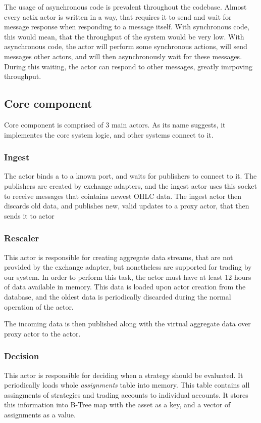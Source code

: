 
The usage of asynchronous code is prevalent throughout the codebase. Almost every actix actor is written in a way, that requires
it to send and wait for message response when responding to a message itself. With synchronous code, this would mean, that
the throughput of the system would be very low. With asynchronous code, the actor will perform some synchronous actions,
will send messages other actors, and will then asynchronously wait for these messages. During this waiting, the actor
can respond to other messages, greatly imrpoving throughput.

\subsection{Core component}
Core component is comprised of 3 main actors. As its name suggests, it implementes the core system logic, and
other systems connect to it.

\subsubsection{Ingest}
The  actor binds a  to a known port, and waits for publishers to connect to it.
The publishers are created by exchange adapters, and the ingest actor uses this socket to receive
messages that cointains newest OHLC data. The ingest actor then discards old data, and publishes new, valid updates
to a proxy actor, that then sends it to  actor

\subsubsection{Rescaler}
This actor is responsible for creating aggregate data streams, that are not provided
by the exchange adapter, but nonetheless are supported for trading by our system. In order
to perform this task, the actor must have at least 12 hours of data available in memory. This data is loaded upon
actor creation from the database, and the oldest data is periodically discarded during the normal operation of the actor.

The incoming data is then published along with the virtual aggregate data over proxy actor to the  actor.

\subsubsection{Decision}
This actor is responsible for deciding when a strategy should be evaluated. It periodically loads whole
\textit{assignments} table into memory. This table contains all assingments of strategies and trading accounts
to individual accounts. It stores this information into B-Tree map with the asset as a
key, and a vector of assignments as a value.

